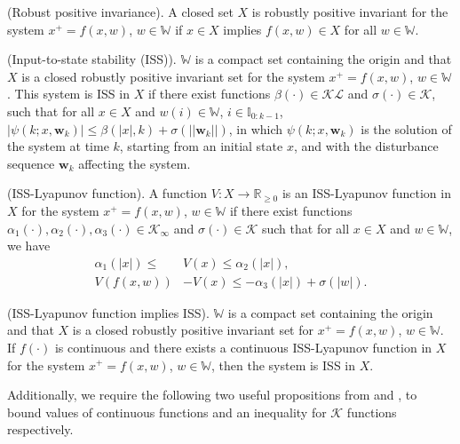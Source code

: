 \documentclass[preprint,5p, twocolumn, authoryear]{elsarticle}
\newcommand{\bbI}{\mathbb{I}}
\newcommand{\bbR}{\mathbb{R}}
\newcommand{\norm}[1]{\left| #1 \right|}
\newcommand{\bbW}{\mathbb{W}}
\begin{document}
\begin{definition} \label{def:robust_pos_invariance} (Robust positive
invariance). A closed set $X$ is robustly positive invariant for the system $x^+
= f(x, w)$, $w \in \bbW$ if $x \in X$ implies $f(x, w) \in X$ for all $w \in
\bbW$.
\end{definition}

\begin{definition} \label{def:iss} (Input-to-state stability (ISS)). $\bbW$ is a
compact set containing the origin and that $X$ is a closed robustly positive
invariant set for the system $x^+ = f(x, w)$, $w \in \bbW$. This system is ISS
in $X$ if there exist functions $\beta(\cdot) \in \mathcal{K}\mathcal{L}$ and
$\sigma(\cdot) \in \mathcal{K}$, such that for all $x \in X$ and $w(i) \in
\bbW$, $i \in \bbI_{0:k-1}$, $\norm{\psi(k; x, \mathbf{w}_k)} \leq
\beta(\norm{x}, k) + \sigma(\norm{\norm{\mathbf{w}_k}})$, in which $\psi(k; x,
\mathbf{w}_k)$ is the solution of the system at time $k$, starting from an
initial state $x$, and with the disturbance sequence $\mathbf{w}_k$ affecting
the system.
\end{definition}

\begin{definition} \label{def:iss_lyapunov_func} (ISS-Lyapunov function). A
function $V : X \rightarrow \bbR_{\geq 0}$ is an ISS-Lyapunov function in $X$
for the system $x^+ = f(x, w)$, $w \in \bbW$ if there exist functions
$\alpha_1(\cdot), \alpha_2(\cdot), \alpha_3(\cdot) \in \mathcal{K}_{\infty}$ and
$\sigma(\cdot) \in \mathcal{K}$ such that for all $x \in X$ and $w \in \bbW$, we
have
\begin{align*}
    \alpha_1(\norm{x}) \leq & V(x) \leq \alpha_2(\norm{x}), \\
    V(f(x, w)) &- V(x) \leq -\alpha_3(\norm{x}) + \sigma(\norm{w}).
\end{align*}
\end{definition}

\begin{prop} \label{prop:lyapunov_implies_iss} (ISS-Lyapunov function implies
ISS). $\bbW$ is a compact set containing the origin and that $X$ is a closed
robustly positive invariant set for $x^+ = f(x, w)$, $w \in \bbW$. If $f(\cdot)$
is continuous and there exists a continuous ISS-Lyapunov function in $X$ for the
system $x^+ = f(x, w)$, $w \in \bbW$, then the system is ISS in $X$.
\end{prop}

Additionally, we require the following two useful propositions from
\cite{allan:bates:risbeck:rawlings:2017} and \cite{rawlings:ji:2012}, to bound
values of continuous functions and an inequality for $\mathcal{K}$ functions
respectively.
\end{document}
